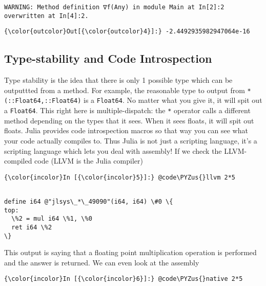 \documentclass[11pt]{article}
\def\PYZus{\char`\_}
\begin{document}
    \begin{Verbatim}[commandchars=\\\{\}]
WARNING: Method definition ∇f(Any) in module Main at In[2]:2 overwritten at In[4]:2.

    \end{Verbatim}

            \begin{Verbatim}[commandchars=\\\{\}]
{\color{outcolor}Out[{\color{outcolor}4}]:} -2.4492935982947064e-16
\end{Verbatim}
        
    \subsection{Type-stability and Code
Introspection}\label{type-stability-and-code-introspection}

Type stability is the idea that there is only 1 possible type which can
be outputtted from a method. For example, the reasonable type to output
from \texttt{*(::Float64,::Float64)} is a \texttt{Float64}. No matter
what you give it, it will spit out a \texttt{Float64}. This right here
is multiple-dispatch: the \texttt{*} operator calls a different method
depending on the types that it sees. When it sees floats, it will spit
out floats. Julia provides code introspection macros so that way you can
see what your code actually compiles to. Thus Julia is not just a
scripting language, it's a scripting language which lets you deal with
assembly! If we check the LLVM-compiled code (LLVM is the Julia
compiler)

    \begin{Verbatim}[commandchars=\\\{\}]
{\color{incolor}In [{\color{incolor}5}]:} @code\PYZus{}llvm 2*5
\end{Verbatim}

    \begin{Verbatim}[commandchars=\\\{\}]

define i64 @"jlsys\_*\_49090"(i64, i64) \#0 \{
top:
  \%2 = mul i64 \%1, \%0
  ret i64 \%2
\}

    \end{Verbatim}

    This output is saying that a floating point multiplication operation is
performed and the answer is returned. We can even look at the assembly

    \begin{Verbatim}[commandchars=\\\{\}]
{\color{incolor}In [{\color{incolor}6}]:} @code\PYZus{}native 2*5
\end{Verbatim}
\end{document}

